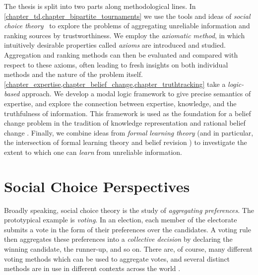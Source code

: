 The thesis is split into two parts along methodological lines. In
\cref{chapter_td,chapter_bipartite_tournaments} we use the tools and ideas of
\emph{social choice theory}~\cite{zwicker2016voting} to explore the problems of
aggregating unreliable information and ranking sources by trustworthiness. We
employ the \emph{axiomatic method}, in which intuitively desirable properties
called \emph{axioms} are introduced and studied. Aggregation and ranking
methods can then be evaluated and compared with respect to these axioms, often
leading to fresh insights on both individual methods and the nature of the
problem itself.
%
\cref{chapter_expertise,chapter_belief_change,chapter_truthtracking} take a
\emph{logic-based} approach. We develop a modal logic framework to give precise
semantics of expertise, and explore the connection between expertise,
knowledge, and the truthfulness of information. This framework is used as the
foundation for a belief change problem in the tradition of knowledge
representation and rational belief change . Finally, we combine ideas
from \emph{formal learning theory}  (and in particular, the
intersection of formal learning theory and belief revision ) to
investigate the extent to which one can \emph{learn} from unreliable
information.

\section{Social Choice Perspectives}

Broadly speaking, social choice theory is the study of \emph{aggregating
preferences}. The prototypical example is \emph{voting}. In an election, each
member of the electorate submits a vote in the form of their preferences over
the candidates. A voting rule then aggregates these preferences into a
\emph{collective decision} by declaring the winning candidate, the runner-up,
and so on. There are, of course, many different voting methods which can be
used to aggregate votes, and several distinct methods are in use in different
contexts across the world .

